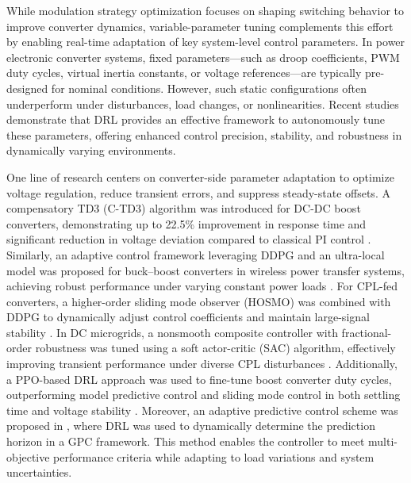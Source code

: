 While modulation strategy optimization focuses on shaping switching behavior to improve converter dynamics, variable-parameter tuning complements this effort by enabling real-time adaptation of key system-level control parameters. In power electronic converter systems, fixed parameters—such as droop coefficients, PWM duty cycles, virtual inertia constants, or voltage references—are typically pre-designed for nominal conditions. However, such static configurations often underperform under disturbances, load changes, or nonlinearities. Recent studies demonstrate that DRL provides an effective framework to autonomously tune these parameters, offering enhanced control precision, stability, and robustness in dynamically varying environments.

One line of research centers on converter-side parameter adaptation to optimize voltage regulation, reduce transient errors, and suppress steady-state offsets. A compensatory TD3 (C-TD3) algorithm was introduced for DC-DC boost converters, demonstrating up to 22.5\% improvement in response time and significant reduction in voltage deviation compared to classical PI control \cite{cheng2025novel}. Similarly, an adaptive control framework leveraging DDPG and an ultra-local model was proposed for buck–boost converters in wireless power transfer systems, achieving robust performance under varying constant power loads \cite{gheisarnejad2020novel}. For CPL-fed converters, a higher-order sliding mode observer (HOSMO) was combined with DDPG to dynamically adjust control coefficients and maintain large-signal stability \cite{huangfu2022learning}. In DC microgrids, a nonsmooth composite controller with fractional-order robustness was tuned using a soft actor-critic (SAC) algorithm, effectively improving transient performance under diverse CPL disturbances \cite{zhou2023drl}. Additionally, a PPO-based DRL approach was used to fine-tune boost converter duty cycles, outperforming model predictive control and sliding mode control in both settling time and voltage stability \cite{saha2024proximal}. Moreover, an adaptive predictive control scheme was proposed in \cite{cui2023adaptive}, where DRL was used to dynamically determine the prediction horizon in a GPC framework. This method enables the controller to meet multi-objective performance criteria while adapting to load variations and system uncertainties.


